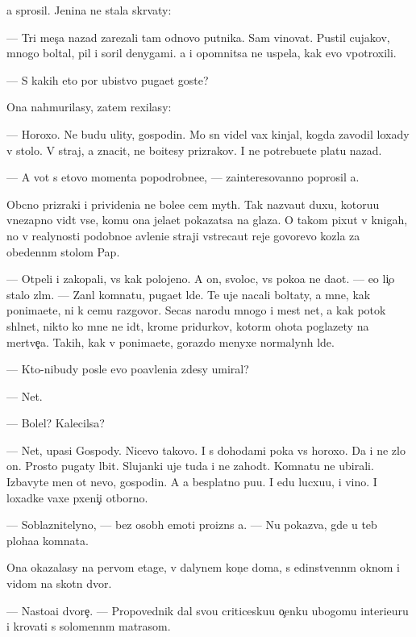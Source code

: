 \documentclass[10pt]{book}
\begin{document}
{\Y}a sprosil. Jen{\x}ina ne stala skr{\yi}vaty:

— Tri mes{\ia}{\c}a nazad zarezali tam odnovo putnika. Sam vinovat. Pustil cujakov, mnogo boltal, pil i soril denygami. {\Y}a i opomnitsa ne uspela, kak {\y}evo v{\yi}potroxili.

— S kakih eto por ubi{\y}stvo puga{\y}et goste{\y}?

Ona nahmurilasy, zatem rexilasy:

— Horoxo. Ne budu {\y}ulity, gospodin. Mo{\y} s{\yi}n videl vax kinjal, kogda zavodil loxady v sto{\y}lo. V{\yi} straj, a znacit, ne bo{\y}itesy prizrakov. I ne potrebu{\y}ete platu nazad.

— A vot s etovo momenta popodrobne{\y}e, — zainteresovanno poprosil {\y}a.

Ob{\yi}cno prizraki i privideni{\y}a ne bole{\y}e cem myth. Tak naz{\yi}va{\y}ut duxu, kotoru{\y}u vnezapno vid{\ia}t vse, komu ona jela{\y}et pokazatsa na glaza. O takom pixut v knigah, no v realynosti podobno{\y}e {\y}avleni{\y}e straji vstreca{\y}ut reje govor{\ia}{\x}evo kozla za obedenn{\yi}m stolom Pap{\yi}.

— Otpeli i zakopali, vs{\e} kak polojeno. A on, svoloc, vs{\e} poko{\y}a ne da{\y}ot. — {\Y}e{\y}o li{\c}o stalo zl{\yi}m. — Zan{\ia}l komnatu, puga{\y}et l{\io}de{\y}. Te uje nacali boltaty, a mne, kak ponima{\y}ete, ni k cemu razgovor{\yi}. Se{\y}cas narodu mnogo i mest net, a kak potok shl{\yi}net, nikto ko mne ne id{\e}t, krome pridurkov, kotor{\yi}m ohota poglazety na mertve{\c}a. Takih, kak v{\yi} ponima{\y}ete, gorazdo menyxe normalyn{\yi}h l{\io}de{\y}.

— Kto-nibudy posle {\y}evo po{\y}avleni{\y}a zdesy umiral?

— Net.

— Bolel? Kalecilsa?

— Net, upasi Gospody. Nicevo takovo. I s dohodami poka vs{\e} horoxo. Da i ne zlo{\y} on. Prosto pugaty l{\io}bit. Slujanki uje tuda i ne zahod{\ia}t. Komnatu ne ubirali. Izbavyte men{\ia} ot nevo, gospodin. A {\y}a besplatno pu{\x}u. I {\y}edu lucxu{\y}u, i vino. I loxadke vaxe{\y} pxeni{\c}i otborno{\y}.

— Soblaznitelyno, — bez osob{\yi}h emoti{\y} proizn{\e}s {\y}a. — Nu pokaz{\yi}va{\y}, gde u teb{\ia} ploha{\y}a komnata.

Ona okazalasy na pervom etage, v dalynem kon{\c}e doma, s {\y}edinstvenn{\yi}m oknom i vidom na skotn{\yi}{\y} dvor.

— Nasto{\y}a{\x}i{\y} dvore{\c}. — Propovednik dal svo{\y}u criticesku{\y}u o{\c}enku ubogomu interieuru i krovati s solomenn{\yi}m matrasom.
\end{document}
